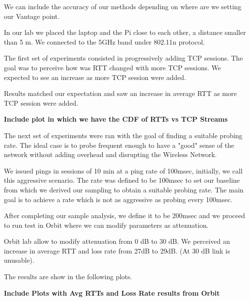 We can include the accuracy of our methods depending on where are we setting our Vantage point.

In our lab we placed the laptop and the Pi close to each other, a distance smaller than 5 m. We connected to the 5GHz band under 802.11n protocol.

The first set of experiments consisted in progressively adding TCP sessions. The goal was to perceive how was RTT changed with more TCP sessions. We expected to see an increase as more TCP session were added.

Results matched our expectation and saw an increase in average RTT as more TCP session were added.

\textbf{Include plot in which we have the CDF of RTTs vs TCP Streams}

The next set of experiments were ran with the goal of finding a suitable probing rate. The ideal case is to probe frequent enough to have a "good" sense of the network without adding overhead and disrupting the Wireless Network.

We issued pings in sessions of 10 min at a ping rate of 100msec, initially, we call this aggressive scenario. The rate was defined to be 100msec to set our baseline from which we derived our sampling to obtain a suitable probing rate. The main goal is to achieve a rate which is not as aggressive as probing every 100msec.

After completing our sample analysis, we define it to be 200msec and we proceed to run test in Orbit where we can modify parameters as attenuation.

Orbit lab allow to modify attenuation from 0 dB to 30 dB. We perceived an increase in average RTT and loss rate from 27dB to 29dB. (At 30 dB link is unusable).

The results are show in the following plots.

\textbf{Include Plots with Avg RTTs and Loss Rate results from Orbit}




